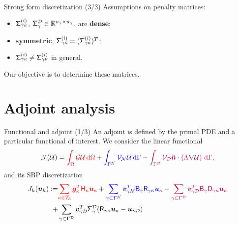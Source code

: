 \documentclass{beamer}
\begin{document}
\begin{frame}{Strong form discretization (3/3)}
    Assumptions on penalty matrices:
    \begin{itemize}
        \item $\mathsf{\Sigma}_{\gamma\kappa}^{(i)}$, $\mathsf{\Sigma}_{\gamma}^{\mathcal{D}} \in \mathbb{R}^{n_\gamma\times n_\gamma}$, are \textbf{dense};
        \item \textbf{symmetric}, $\mathsf{\Sigma}_{\gamma\kappa}^{(i)} = (\mathsf{\Sigma}_{\gamma\kappa}^{(i)})^T$;
        \item $\mathsf{\Sigma}_{\gamma\kappa}^{(i)} \ne \mathsf{\Sigma}_{\gamma\nu}^{(i)}$ in general.
    \end{itemize}
\vskip 5mm
Our objective is to determine these matrices.
\end{frame}

\section{Adjoint analysis}
\begin{frame}{Functional and adjoint (1/3)}
    An adjoint is defined by the primal PDE and a particular functional of interest. We consider the linear functional
    \begin{equation*}
    \mathcal{J}(\mathcal{U}) = {\color{red}\int_{\Omega} \mathcal{G} \mathcal{U} \, \mathrm{d} \Omega}
    +  {\color{blue}\int_{\Gamma^{\mathcal{N}}} \mathcal{V}_{\mathcal{N}} \mathcal{U} \, \mathrm{d}\Gamma }
    -  {\color{purple}\int_{\Gamma^{\mathcal{D}}} \mathcal{V}_{\mathcal{D}} \hat{\bm{n}} \cdot \left(\Lambda \nabla \mathcal{U} \right) \, \mathrm{d}\Gamma} ,
    \end{equation*}
    and its SBP discretization
    \begin{equation*}
    \begin{aligned}
    J_h(\bm{u}_h) :=& {\color{red}\sum_{\kappa \in \mathcal{T}_{h}}\bm{g}_{\kappa}^T\mathsf{H}_{\kappa}\bm{u}_\kappa}
    + {\color{blue}\sum_{\gamma \subset \Gamma^{\mathcal{N}}} \bm{v}_{\gamma \mathcal{N}}^T\mathsf{B}_{\gamma}\mathsf{R}_{\gamma\kappa}\bm{u}_\kappa}
    - {\color{purple}\sum_{\gamma \subset \Gamma^{\mathcal{D}}} \bm{v}_{\gamma \mathcal{D}}^T\mathsf{B}_{\gamma}\mathsf{D}_{\gamma\kappa}\bm{u}_\kappa} \\
    +& \sum_{\gamma \subset \Gamma^{\mathcal{D}}} \bm{v}_{\gamma \mathcal{D}}^T\mathsf{\Sigma}_{\gamma}^{\mathcal{D}} (\mathsf{R}_{\gamma\kappa}\bm{u}_\kappa - \bm{u}_{\gamma \mathcal{D}})
    \end{aligned}
    \end{equation*}
\end{frame}
\end{document}
